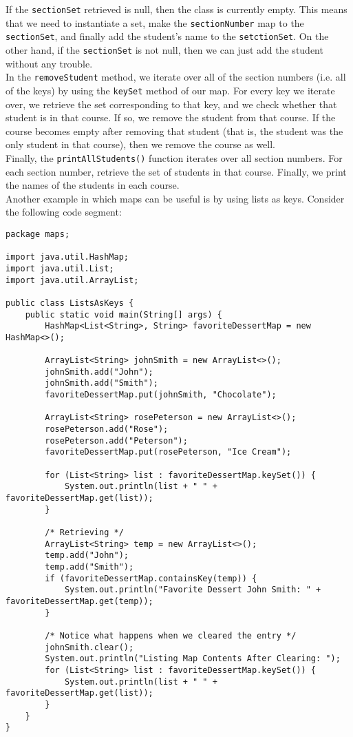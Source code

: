 If the \verb!sectionSet! retrieved is null, then the class is currently empty. This means that we need to instantiate a set, make the \verb!sectionNumber! map to the \verb!sectionSet!, and finally add the student's name to the \verb!setctionSet!. On the other hand, if the \verb!sectionSet! is not null, then we can just add the student without any trouble. \\

In the \verb!removeStudent! method, we iterate over all of the section numbers (i.e. all of the keys) by using the \verb!keySet! method of our map. For every key we iterate over, we retrieve the set corresponding to that key, and we check whether that student is in that course. If so, we remove the student from that course. If the course becomes empty after removing that student (that is, the student was the only student in that course), then we remove the course as well. \\

Finally, the \verb!printAllStudents()! function iterates over all section numbers. For each section number, retrieve the set of students in that course. Finally, we print the names of the students in each course.  \\


Another example in which maps can be useful is by using lists as keys. Consider the following code segment: 


\begin{lstlisting}
package maps;

import java.util.HashMap;
import java.util.List;
import java.util.ArrayList;

public class ListsAsKeys {
	public static void main(String[] args) {
		HashMap<List<String>, String> favoriteDessertMap = new HashMap<>();

		ArrayList<String> johnSmith = new ArrayList<>();
		johnSmith.add("John");
		johnSmith.add("Smith");
		favoriteDessertMap.put(johnSmith, "Chocolate");

		ArrayList<String> rosePeterson = new ArrayList<>();
		rosePeterson.add("Rose");
		rosePeterson.add("Peterson");
		favoriteDessertMap.put(rosePeterson, "Ice Cream");

		for (List<String> list : favoriteDessertMap.keySet()) {
			System.out.println(list + " " + favoriteDessertMap.get(list));
		}

		/* Retrieving */
		ArrayList<String> temp = new ArrayList<>();
		temp.add("John");
		temp.add("Smith");
		if (favoriteDessertMap.containsKey(temp)) {
			System.out.println("Favorite Dessert John Smith: " + favoriteDessertMap.get(temp));
		}

		/* Notice what happens when we cleared the entry */
		johnSmith.clear();
		System.out.println("Listing Map Contents After Clearing: ");
		for (List<String> list : favoriteDessertMap.keySet()) {
			System.out.println(list + " " + favoriteDessertMap.get(list));
		}
	}
}
\end{lstlisting}

